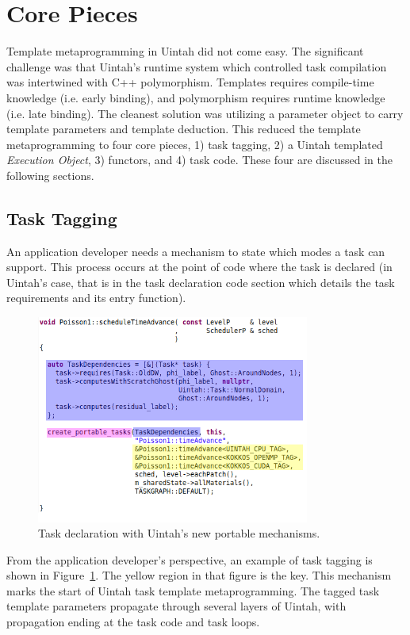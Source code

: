 \documentclass[]{article}
\begin{document}
\section{Core Pieces}

Template metaprogramming in Uintah did not come easy.  The significant challenge was that Uintah's runtime system which controlled task compilation was intertwined with C++ polymorphism.  Templates requires compile-time knowledge (i.e. early binding), and polymorphism requires runtime knowledge (i.e. late binding).  The cleanest solution was utilizing a parameter object to carry template parameters and template deduction.  This reduced the template metaprogramming to four core pieces, 1) task tagging, 2) a Uintah templated \emph{Execution Object}, 3) functors, and 4) task code.  These four are discussed in the following sections.

\subsection{Task Tagging}
\label{sec:task_tagging}
An application developer needs a mechanism to state which modes a task can support.  This process occurs at the point of code where the task is declared (in Uintah's case, that is in the task declaration code section which details the task requirements and its entry function).  

\begin{figure}[h]
	\centerline{
		\includegraphics[width=0.8\textwidth,draft=false]{figures/poissonTaskAfter.png}
	}
	\caption{Task declaration with Uintah's new portable mechanisms.} 
	\label{fig:poisson_task_after}
\end{figure}

From the application developer's perspective, an example of task tagging is shown in Figure~\ref{fig:poisson_task_after}.  The yellow region in that figure is the key.  This mechanism marks the start of Uintah task template metaprogramming.   The tagged task template parameters propagate through several layers of Uintah, with propagation ending at the task code and task loops.  
\end{document}
